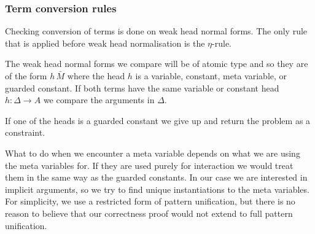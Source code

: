 \subsubsection{Term conversion rules}

Checking conversion of terms is done on weak head normal forms. The only rule
that is applied before weak head normalisation is the $\eta$-rule.


The weak head normal forms we compare will be of atomic type and so they are of
the form $h\,\bar M$ where the head $h$ is a variable, constant, meta variable,
or guarded constant. If both terms have the same variable or constant head $h :
\Delta \to A$ we compare the arguments in $\Delta$.


If one of the heads is a guarded constant we give up and return the problem as
a constraint.


What to do when we encounter a meta variable depends on what we are using the
meta variables for. If they are used purely for interaction we would treat them
in the same way as the guarded constants. In our case we are interested in
implicit arguments, so we try to find unique instantiations to the meta
variables. For simplicity, we use a restricted form of pattern
unification, but there is no
reason to believe that our correctness proof would not extend to full pattern
unification.

